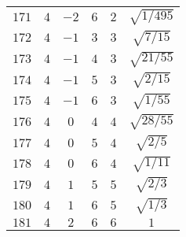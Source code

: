 \begin{table}
\begin{center}
\begin{tabular}{|c|c|c|c|c|c|}
$171$ & $4$ & $-2$ & $6$ & $2$ & $\sqrt{1/495}$ \\ 
$172$ & $4$ & $-1$ & $3$ & $3$ & $\sqrt{7/15}$ \\ 
$173$ & $4$ & $-1$ & $4$ & $3$ & $\sqrt{21/55}$ \\ 
$174$ & $4$ & $-1$ & $5$ & $3$ & $\sqrt{2/15}$ \\ 
$175$ & $4$ & $-1$ & $6$ & $3$ & $\sqrt{1/55}$ \\ 
$176$ & $4$ & $0$ & $4$ & $4$ & $\sqrt{28/55}$ \\ 
$177$ & $4$ & $0$ & $5$ & $4$ & $\sqrt{2/5}$ \\ 
$178$ & $4$ & $0$ & $6$ & $4$ & $\sqrt{1/11}$ \\ 
$179$ & $4$ & $1$ & $5$ & $5$ & $\sqrt{2/3}$ \\ 
$180$ & $4$ & $1$ & $6$ & $5$ & $\sqrt{1/3}$ \\ 
$181$ & $4$ & $2$ & $6$ & $6$ & $1$ \\ 
\hline 
\end{tabular}
\end{center}
\end{table}

